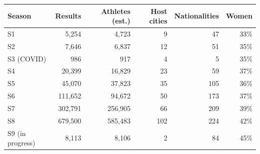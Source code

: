 \begin{tabular}{lrrrrr}
\toprule
\textbf{Season} & \multicolumn{1}{r}{\textbf{Results}} & \multicolumn{1}{r}{\textbf{Athletes (est.)}} & \multicolumn{1}{r}{\textbf{Host cities}} & \multicolumn{1}{r}{\textbf{Nationalities}} & \multicolumn{1}{r}{\textbf{Women}} \\
\midrule
S1 & 5,254 & 4,723 & 9 & 47 & 33\% \\
S2 & 7,646 & 6,837 & 12 & 51 & 35\% \\
S3 (COVID) & 986 & 917 & 4 & 5 & 35\% \\
S4 & 20,399 & 16,829 & 23 & 59 & 37\% \\
S5 & 45,070 & 37,823 & 35 & 105 & 36\% \\
S6 & 111,652 & 94,672 & 50 & 173 & 37\% \\
S7 & 302,791 & 256,905 & 66 & 209 & 39\% \\
S8 & 679,500 & 585,483 & 102 & 224 & 42\% \\
S9 (in progress) & 8,113 & 8,106 & 2 & 84 & 45\% \\
\bottomrule
\end{tabular}